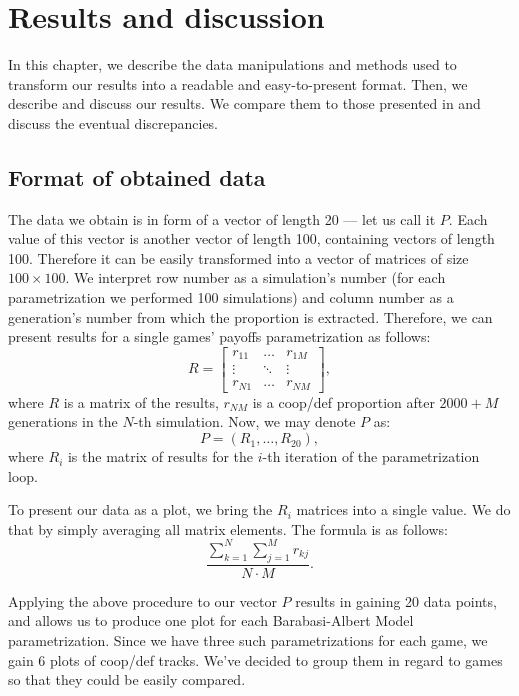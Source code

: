 \documentclass[english, twoside, 12pt, a4paper]{article}
\theoremstyle{definition}
\theoremstyle{plain}
\theoremstyle{remark}
\begin{document}
\clearpage
\section{Results and discussion}

In this chapter, we describe the data manipulations and methods used to transform our results into a readable and easy-to-present format. Then, we describe and discuss our results. We compare them to those presented in \cite{santos2005scale} and discuss the eventual discrepancies. 

\subsection{Format of obtained data}

The data we obtain is in form of a vector of length 20 --- let us call it $P$. Each value of this vector is another vector of length 100, containing vectors of length 100. Therefore it can be easily transformed into a vector of matrices of size $100 \times 100$. We interpret row number as a simulation's number (for each parametrization we performed 100 simulations) and column number as a generation's number from which the proportion is extracted. Therefore, we can present results for a single games' payoffs parametrization as follows:
\[
R = \begin{bmatrix} 
    r_{11} & \dots & r_{1M} \\
    \vdots & \ddots & \vdots \\
    r_{N1} &  \dots      & r_{NM} 
    \end{bmatrix}
,\]
where $R$ is a matrix of the results, $r_{NM}$ is a coop/def proportion after $2000 + M$ generations in the $N$-th simulation. Now, we may denote $P$ as:
\[
  P = (R_1, \dots, R_{20}),
\]
where $R_i$ is the matrix of results for the \(i\)-th iteration of the parametrization loop.

To present our data as a plot, we bring the $R_i$ matrices into a single value. We do that by simply averaging all matrix elements. The formula is as follows:
\[
  \frac{\sum_{k=1}^{N}\sum_{j=1}^{M} r_{kj}}{N \cdot M} .
\] 

Applying the above procedure to our vector \( P\) results in gaining 20 data points, and allows us to produce one plot for each Barabasi-Albert Model parametrization. Since we have three such parametrizations for each game, we gain 6 plots of coop/def tracks. We've decided to group them in regard to games so that they could be easily compared. 
\end{document}
